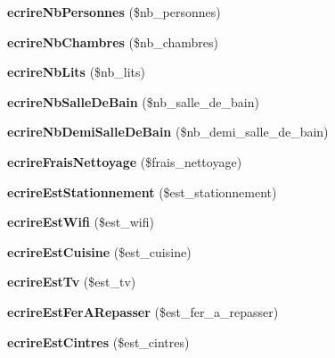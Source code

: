 \begin{DoxyCompactItemize}
{\bfseries ecrire\+Nb\+Personnes} (\$nb\+\_\+personnes)
\item 
\mbox{\label{class_logement_a04c1730dee99f5fe7096cfa16ef0a734}} 
{\bfseries ecrire\+Nb\+Chambres} (\$nb\+\_\+chambres)
\item 
\mbox{\label{class_logement_a0f2cce293aa55309cac5de1df25f415a}} 
{\bfseries ecrire\+Nb\+Lits} (\$nb\+\_\+lits)
\item 
\mbox{\label{class_logement_aa969f4e6873f424b9a9b55dc0a8a8b9f}} 
{\bfseries ecrire\+Nb\+Salle\+De\+Bain} (\$nb\+\_\+salle\+\_\+de\+\_\+bain)
\item 
\mbox{\label{class_logement_a7ca4c02d8793a927b7032793d401274f}} 
{\bfseries ecrire\+Nb\+Demi\+Salle\+De\+Bain} (\$nb\+\_\+demi\+\_\+salle\+\_\+de\+\_\+bain)
\item 
\mbox{\label{class_logement_ac57dfa56ee4db0cfe93082117006a9f9}} 
{\bfseries ecrire\+Frais\+Nettoyage} (\$frais\+\_\+nettoyage)
\item 
\mbox{\label{class_logement_a5fd5fc36c77e9311672773fbd56e3b87}} 
{\bfseries ecrire\+Est\+Stationnement} (\$est\+\_\+stationnement)
\item 
\mbox{\label{class_logement_a63be74bcf002f0c37f0d94fc1fae6480}} 
{\bfseries ecrire\+Est\+Wifi} (\$est\+\_\+wifi)
\item 
\mbox{\label{class_logement_a003419d72913ebbdaeef631ffbf83267}} 
{\bfseries ecrire\+Est\+Cuisine} (\$est\+\_\+cuisine)
\item 
\mbox{\label{class_logement_add6852f4c4a89490a74e15330079822e}} 
{\bfseries ecrire\+Est\+Tv} (\$est\+\_\+tv)
\item 
\mbox{\label{class_logement_aa58c2d4faaf4a47ad7dafce728e7bdbf}} 
{\bfseries ecrire\+Est\+Fer\+A\+Repasser} (\$est\+\_\+fer\+\_\+a\+\_\+repasser)
\item 
\mbox{\label{class_logement_a7a4b80fe2653f6d0140dc016acaf925a}} 
{\bfseries ecrire\+Est\+Cintres} (\$est\+\_\+cintres)

\end{DoxyCompactItemize}
